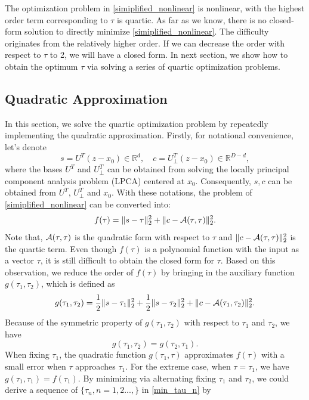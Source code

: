 \documentclass{article}
\theoremstyle{remark}
\begin{document}
The optimization problem in \eqref{simiplified_nonlinear} is nonlinear, with the highest order term corresponding to $\tau$ is quartic. As far as we know, there is no closed-form solution to directly minimize \eqref{simiplified_nonlinear}. The difficulty originates from the relatively higher order. If we can decrease the order with respect to $\tau$ to 2, we will have a closed form. In next section, we show how to obtain the optimum $\tau$ via solving a series of quartic optimization problems.
\subsection{Quadratic Approximation}
In this section, we solve the quartic optimization problem by repeatedly implementing the quadratic approximation.
Firstly, for notational convenience, let's denote 
\[
s = U^T (z-x_0)\in {\mathbb R}^{d}, \quad c = U^T_{\perp}(z-x_0)\in {\mathbb R}^{D-d},
\]
where the bases $U^T$ and $U^T_{\perp}$ can be obtained from solving the locally principal component analysis problem (LPCA) centered at $x_0$. Consequently, $s, c$ can be obtained from $U^T$, $U^T_\perp$ and $x_0$.
With these notations, the problem of \eqref{simiplified_nonlinear} can be converted into:
\begin{equation}\label{f_tau}
f(\tau) = \|s-\tau\|_2^2+\|c- {{\cal A}} (\tau,\tau)\|_2^2.
\end{equation}
Note that, ${{\cal A}} (\tau,\tau)$ is the quadratic form with respect to $\tau$ and $\|c- {{\cal A}} (\tau,\tau)\|_2^2$ is the quartic term. Even though $f(\tau)$ is a polynomial function with the input as a vector $\tau$, it is still difficult to obtain the closed form for $\tau$. Based on this observation, we reduce the order of $f(\tau)$ 
by bringing in the auxiliary function $g(\tau_1,\tau_2)$, which is defined as
\[
g(\tau_1,\tau_2) =\frac{1}{2} \|s-\tau_1\|_2^2+\frac{1}{2} \|s-\tau_2\|_2^2+\|c- {\cal A} (\tau_1,\tau_2)\|_2^2.
\]
Because of the symmetric property of $g(\tau_1,\tau_2)$ with respect to $\tau_1$ and $\tau_2$, we have
\[
g(\tau_1,\tau_2) = g(\tau_2,\tau_1).
\]
When fixing $\tau_1$, the quadratic function $g(\tau_1,\tau)$ approximates $f(\tau)$ with a small error when $\tau$ approaches $ \tau_1$. For the extreme case, when $\tau=\tau_1$, we have $g(\tau_1,\tau_1)=f(\tau_1)$. By minimizing via alternating fixing $\tau_1$ and $\tau_2$, we could derive a sequence of $\{\tau_n, n=1,2...,\}$ in \eqref{min_tau_n} by
\end{document}
